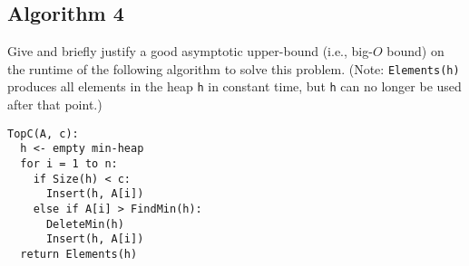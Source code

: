 \documentclass[11pt, oneside]{article}   	%
\theoremstyle{definition}
\theoremstyle{remark}
\begin{document}
\subsection{Algorithm 4}

Give and briefly justify a good asymptotic upper-bound (i.e., big-$O$
bound) on the runtime of the following algorithm to solve this
problem. (Note: \texttt{Elements(h)} produces all elements in the heap \texttt{h} in
constant time, but \texttt{h} can no longer be used after that point.)

\begin{verbatim}
TopC(A, c):
  h <- empty min-heap
  for i = 1 to n:
    if Size(h) < c:
      Insert(h, A[i])
    else if A[i] > FindMin(h):
      DeleteMin(h)
      Insert(h, A[i])
  return Elements(h)
\end{verbatim}
\end{document}
